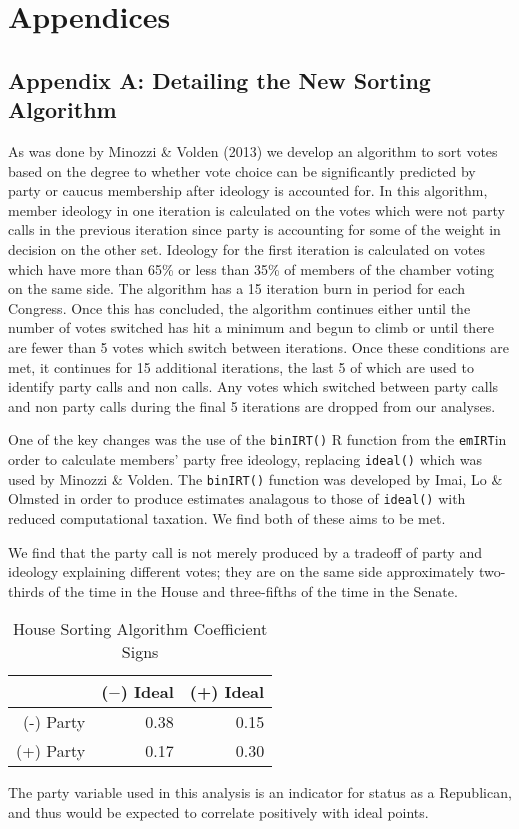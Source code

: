 \documentclass[12pt]{article}
\newcommand\fnote[1]{\captionsetup{font=small}\caption*{#1}}
\begin{document}



\pagebreak

\section{Appendices}

\subsection{Appendix A: Detailing the New Sorting Algorithm}

As was done by Minozzi \& Volden (2013) we develop an algorithm to sort votes based on the degree to whether vote choice can be significantly predicted by party or caucus membership after ideology is accounted for. In this algorithm, member ideology in one iteration is calculated on the votes which were not party calls in the previous iteration since party is accounting for some of the weight in decision on the other set. Ideology for the first iteration is calculated on votes which have more than 65\% or less than 35\% of members of the chamber voting on the same side. The algorithm has a 15 iteration burn in period for each Congress. Once this has concluded, the algorithm continues either until the number of votes switched has hit a minimum and begun to climb or until there are fewer than 5 votes which switch between iterations. Once these conditions are met, it continues for 15 additional iterations, the last 5 of which are used to identify party calls and non calls. Any votes which switched between party calls and non party calls during the final 5 iterations are dropped from our analyses.

One of the key changes was the use of the \verb|binIRT()| R function from the \verb|emIRT|in order to calculate members' party free ideology, replacing \verb|ideal()| which was used by Minozzi \& Volden. The \verb|binIRT()| function was developed by Imai, Lo \& Olmsted in order to produce estimates analagous to those of \verb|ideal()| with reduced computational taxation. We find both of these aims to be met.

We find that the party call is not merely produced by a tradeoff of party and ideology explaining different votes; they are on the same side approximately two-thirds of the time in the House and three-fifths of the time in the Senate.

\begin{table}[H]
	\centering
	\singlespacing
	\caption{House Sorting Algorithm Coefficient Signs}
	\begin{tabular}{rrr}
		\hline
		& ($-$) Ideal & (+) Ideal \\ 
		\hline
		(-) Party & 0.38 & 0.15 \\ 
		(+) Party & 0.17 & 0.30 \\ 
		\hline
	\end{tabular}
	\fnote{The party variable used in this analysis is an indicator for status as a Republican, and thus would be expected to correlate positively with ideal points.}
\end{table}
\end{document}
